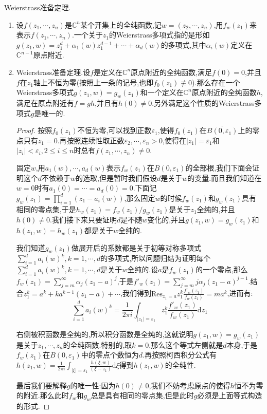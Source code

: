 Weierstrass准备定理.
\begin{enumerate}
	\item 设$f(z_1,\cdots,z_n)$是$\mathbb{C}^n$某个开集上的全纯函数,记$w=(z_2,\cdots,z_n)$,用$f_w(z_1)$来表示$f(z_1,\cdots,z_n)$.一个关于$z_1$的Weierstrass多项式指的是形如$g(z_1,w)=z_1^d+\alpha_1(w)z_1^{d-1}+\cdots+\alpha_d(w)$的多项式,其中$\alpha_i(w)$定义在$\mathbb{C}^{n-1}$原点附近.
	\item Weierstrass准备定理.设$f$是定义在$\mathbb{C}^n$原点附近的全纯函数,满足$f(0)=0$,并且$f$在$z_1$轴上不恒为零(按照上一条的记号,也即$f_0(z_1)\not\equiv0$).那么存在一个Weierstrass多项式$g(z_1,w)=g_w(z_1)$和一个定义在$\mathbb{C}^n$原点附近的全纯函数$h$,满足在原点附近有$f=gh$,并且有$h(0)\not=0$.另外满足这个性质的Weierstrass多项式$g$是唯一的.
	\begin{proof}
		
		按照$f_0(z_1)$不恒为零,可以找到正数$\varepsilon_1$,使得$f_0(z_1)$在$\overline{B(0,\varepsilon_1)}$上的零点只有$z_1=0$.再按照连续性取正数$\varepsilon_2,\cdots,\varepsilon_n>0$,使得在$|z_1|=\varepsilon_1$和$|z_i|<\varepsilon_i,2\le i\le n$时总有$f(z_1,\cdots,z_n)\not=0$.
		
		\qquad
		
		固定$w$,用$a_1(w),\cdots,a_d(w)$表示$f_w(z_1)$在$B(0,\varepsilon_1)$的全部根,我们下面会证明这个$d$不依赖于$w$的选取,但是暂时我们假设$d$是关于$w$的变量.而且我们知道在$w=0$时有$a_1(0)=\cdots=a_d(0)=0$.下面记$g_w(z_1)=\prod_{i=1}^d(z_1-a_i(w))$,那么固定$w$的时候$f_w(z_1)$和$g_w(z_1)$具有相同的零点集,于是$h_w(z_1)=f_w(z_1)/g_w(z_1)$是关于$z_1$全纯的,并且$h(0)\not=0$.我们接下来只要证明$d$是不随$w$变化的,并且$g(z_1,w)=g_w(z_1)$和$h(z_1,w)=h_w(z_1)$都是关于$w$全纯的.
		
		\qquad
		
		我们知道$g_w(z_1)$做展开后的系数都是关于初等对称多项式$\sum_{i=1}^da_i(w)^k,k=1,\cdots,d$的多项式,所以问题归结为证明每个$\sum_{i=1}^da_i(w)^k,k=1,\cdots,d$是关于$w$全纯的.设$a$是$f_w(z_1)$的一个零点,那么$f_w(z_1)=\sum_{j=m}^{\infty}\alpha_j(z_1-a)^j$,于是$f'_w(z_1)=\sum_{j=m}^{\infty}j\alpha_j(z_1-a)^{j-1}$.结合$z_1^k=a^k+ka^{k-1}(z_1-a)+\cdots$,我们得到$\mathrm{Res}_{z_1=a}z_1^k\frac{f'_w(z_1)}{f_w(z_1)}=ma^k$,进而有:
		$$\sum_{i=1}^da_i(w)^k=\frac{1}{2\pi i}\int_{|z_1|=\varepsilon_1}z_1^k\frac{f'_w(z_1)}{f_w(z_1)}\mathrm{d}z_1$$
		
		右侧被积函数是全纯的,所以积分函数是全纯的,这就说明$g(z_1,w)=g_w(z_1)$是关于$z_1,\cdots,z_n$的全纯函数.特别的,取$k=0$,那么这个等式左侧就是$d$本身,于是$f_w(z_1)$在$B(0,\varepsilon_1)$中的零点个数恒为$d$.再按照柯西积分公式有$h(z_1,w)=\frac{1}{2\pi i}\int_{|\xi|=\varepsilon_1}\frac{h(\xi,w)}{(\xi-z_1)}\mathrm{d}\xi$得到$h(z_1,w)$的全纯性.
		
		\qquad
		
		最后我们要解释$g$的唯一性:因为$h(0)\not=0$,我们不妨考虑原点的使得$h$恒不为零的附近.那么此时$f_w$和$g_w$总是具有相同的零点集,但是此时$g$必须是上面等式构造的形式.
	\end{proof}
\end{enumerate}

